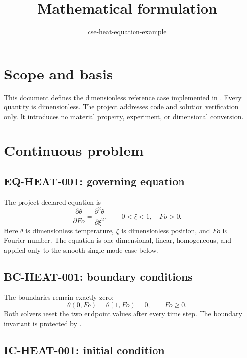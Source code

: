 \documentclass[11pt]{article}
\newcommand{\EqID}[1]{\label{eq:#1}}
\begin{document}
\title{Mathematical formulation}
\author{cse-heat-equation-example}
\date{}
\maketitle

\section{Scope and basis}

This document defines the dimensionless reference case implemented in
. Every quantity is dimensionless.
The project addresses code and solution verification only. It introduces no
material property, experiment, or dimensional conversion.

\section{Continuous problem}

\subsection{EQ-HEAT-001: governing equation}

The project-declared equation is
\begin{equation}
  \frac{\partial \theta}{\partial Fo}
  = \frac{\partial^2 \theta}{\partial \xi^2},
  \qquad 0<\xi<1,\quad Fo>0.
  \EqID{heat-pde}
\end{equation}
Here \(\theta\) is dimensionless temperature, \(\xi\) is dimensionless
position, and \(Fo\) is Fourier number. The equation is one-dimensional,
linear, homogeneous, and applied only to the smooth single-mode case below.

\subsection{BC-HEAT-001: boundary conditions}

The boundaries remain exactly zero:
\begin{equation}
  \theta(0,Fo)=\theta(1,Fo)=0,
  \qquad Fo\geq 0.
  \EqID{heat-bc}
\end{equation}
Both solvers reset the two endpoint values after every time step. The boundary
invariant is protected by .

\subsection{IC-HEAT-001: initial condition}
\end{document}
